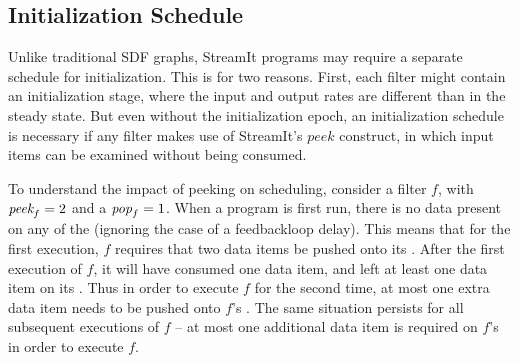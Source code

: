 


\subsection{Initialization Schedule}
\label{sec:init-peeking}

Unlike traditional SDF graphs, StreamIt programs may require a
separate schedule for initialization.  This is for two reasons.
First, each filter might contain an initialization stage, where the
input and output rates are different than in the steady state.  But
even without the initialization epoch, an initialization schedule is
necessary if any filter makes use of StreamIt's $peek$ construct, in
which input items can be examined without being consumed.

To understand the impact of peeking on scheduling, consider a filter
$f$, with $\mbox{\it peek}_f = 2$ and a $\mbox{\it pop}_f = 1$. When a {\StreamIt}
program is first run, there is no data present on any of the
{\Channels} (ignoring the case of a feedbackloop delay).  This means
that for the first execution, {\filter} $f$ requires that two data
items be pushed onto its {\Input} {\Channel}.  After the first
execution of $f$, it will have consumed one data item, and left at
least one data item on its {\Input} {\Channel}.  Thus in order to
execute $f$ for the second time, at most one extra data item needs to
be pushed onto $f$'s {\Input} {\Channel}.  The same situation persists
for all subsequent executions of $f$ -- at most one additional data
item is required on $f$'s {\Input} {\Channel} in order to execute $f$.

